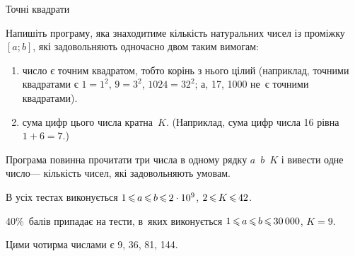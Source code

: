 \begin{problemAllDefault}{Точні квадрати}

Напишіть програму, яка знаходитиме кількість натуральних чисел із проміжку $[a; b]$, які задовольняють одночасно двом таким вимогам:
\begin{enumerate}
\item
число є точним квадратом, тобто корінь з нього цілий (наприклад, точними квадратами є ${1{=}1^2}$, ${9{=}3^2}$, ${1024{=}32^2}$; а, 17, 1000 не~є точними квадратами).
\item
сума цифр цього числа кратна~$K$. (Наприклад, сума цифр числа 16 рівна ${1{+}6{=}7}$.)
\end{enumerate}
Програма повинна прочитати три числа в одному рядку $a$~$b$~$K$ і вивести одне число\nolinebreak[3] --- кількість чисел, які задовольняють умовам.

\Scoring	В усіх тестах виконується $1\dib{{\<}}a\dib{{\<}}b\dib{{\<}}2\cdot10^9$, $2\dib{{\<}}K\dib{{\<}}42$. 

40\%~балів припадає на тести, в~яких виконується $1\dib{{\<}}a\dib{{\<}}b\dib{{\<}}30\,000$, ${K{=}9}$.


\Example
\begin{exampleSimple}{5em}{3em}%
%
\end{exampleSimple}

\Note	Цими чотирма числами є 9, 36, 81, 144. 

\end{problemAllDefault}
